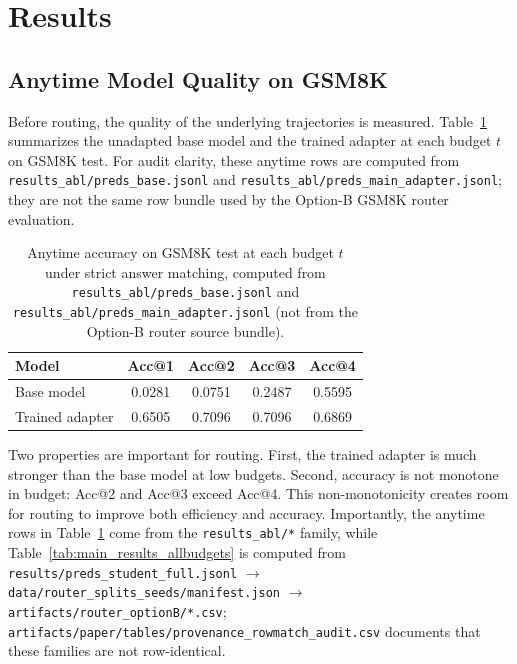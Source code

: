 \documentclass[conference]{IEEEtran}
\begin{document}
\section{Results}

\subsection{Anytime Model Quality on GSM8K}
\label{sec:anytime-results}
Before routing, the quality of the underlying trajectories is measured. Table~\ref{tab:anytime_gsm8k} summarizes the unadapted base model and the trained adapter at each budget $t$ on GSM8K test. For audit clarity, these anytime rows are computed from \texttt{results\_abl/preds\_base.jsonl} and \texttt{results\_abl/preds\_main\_adapter.jsonl}; they are not the same row bundle used by the Option-B GSM8K router evaluation.

\begin{table}[t]
\centering
\small
\setlength{\tabcolsep}{3.5pt}
\renewcommand{\arraystretch}{1.1}
\begin{tabular}{lcccc}
\toprule
Model & Acc@1 & Acc@2 & Acc@3 & Acc@4 \\
\midrule
Base model & 0.0281 & 0.0751 & 0.2487 & 0.5595 \\
Trained adapter & 0.6505 & 0.7096 & 0.7096 & 0.6869 \\
\bottomrule
\end{tabular}
\caption{Anytime accuracy on GSM8K test at each budget $t$ under strict answer matching, computed from \texttt{results\_abl/preds\_base.jsonl} and \texttt{results\_abl/preds\_main\_adapter.jsonl} (not from the Option-B router source bundle).}
\label{tab:anytime_gsm8k}
\end{table}

Two properties are important for routing. First, the trained adapter is much stronger than the base model at low budgets. Second, accuracy is not monotone in budget: Acc@2 and Acc@3 exceed Acc@4. This non-monotonicity creates room for routing to improve both efficiency and accuracy. Importantly, the anytime rows in Table~\ref{tab:anytime_gsm8k} come from the \texttt{results\_abl/*} family, while Table~\ref{tab:main_results_allbudgets} is computed from \texttt{results/preds\_student\_full.jsonl} $\rightarrow$ \texttt{data/router\_splits\_seeds/manifest.json} $\rightarrow$ \texttt{artifacts/router\_optionB/*.csv}; \texttt{artifacts/paper/tables/provenance\_rowmatch\_audit.csv} documents that these families are not row-identical.
\end{document}
